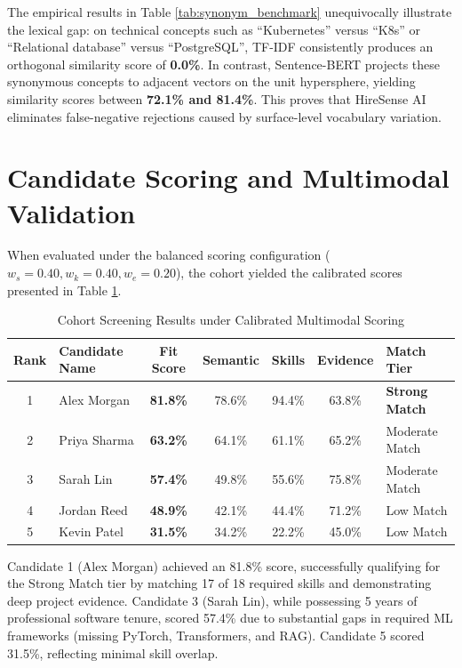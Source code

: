 \documentclass[12pt,a4paper]{report}
\begin{document}
The empirical results in Table \ref{tab:synonym_benchmark} unequivocally illustrate the lexical gap: on technical concepts such as ``Kubernetes'' versus ``K8s'' or ``Relational database'' versus ``PostgreSQL'', TF-IDF consistently produces an orthogonal similarity score of \textbf{0.0\%}. In contrast, Sentence-BERT projects these synonymous concepts to adjacent vectors on the unit hypersphere, yielding similarity scores between \textbf{72.1\% and 81.4\%}. This proves that HireSense AI eliminates false-negative rejections caused by surface-level vocabulary variation.

\section{Candidate Scoring and Multimodal Validation}
When evaluated under the balanced scoring configuration ($w_s = 0.40, w_k = 0.40, w_e = 0.20$), the cohort yielded the calibrated scores presented in Table \ref{tab:cohort_results}.

\begin{table}[h!]
\centering
\caption{Cohort Screening Results under Calibrated Multimodal Scoring}
\label{tab:cohort_results}
\begin{tabular}{|c|l|c|c|c|c|l|}
\hline
\textbf{Rank} & \textbf{Candidate Name} & \textbf{Fit Score} & \textbf{Semantic} & \textbf{Skills} & \textbf{Evidence} & \textbf{Match Tier} \\ \hline
1 & Alex Morgan & \textbf{81.8\%} & 78.6\% & 94.4\% & 63.8\% & \textbf{Strong Match} \\ \hline
2 & Priya Sharma & \textbf{63.2\%} & 64.1\% & 61.1\% & 65.2\% & Moderate Match \\ \hline
3 & Sarah Lin & \textbf{57.4\%} & 49.8\% & 55.6\% & 75.8\% & Moderate Match \\ \hline
4 & Jordan Reed & \textbf{48.9\%} & 42.1\% & 44.4\% & 71.2\% & Low Match \\ \hline
5 & Kevin Patel & \textbf{31.5\%} & 34.2\% & 22.2\% & 45.0\% & Low Match \\ \hline
\end{tabular}
\end{table}

Candidate 1 (Alex Morgan) achieved an 81.8\% score, successfully qualifying for the Strong Match tier by matching 17 of 18 required skills and demonstrating deep project evidence. Candidate 3 (Sarah Lin), while possessing 5 years of professional software tenure, scored 57.4\% due to substantial gaps in required ML frameworks (missing PyTorch, Transformers, and RAG). Candidate 5 scored 31.5\%, reflecting minimal skill overlap.
\end{document}
